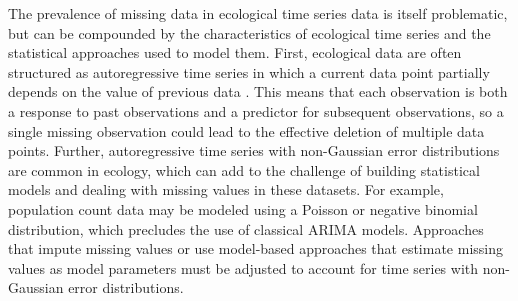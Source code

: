\documentclass{article}
\begin{document}
The prevalence of missing data in ecological time series data is itself problematic, but can be compounded by the characteristics of ecological time series and the statistical approaches used to model them. First, ecological data are often structured as autoregressive time series in which a current data point partially depends on the value of previous data%
. This means that each observation is both a response to past observations and a predictor for subsequent observations, so a single missing observation could lead to the effective deletion of multiple data points. %
Further, autoregressive time series with non-Gaussian error distributions are common in ecology, which can add to the challenge of building statistical models and dealing with missing values in these datasets. For example, population count data may be modeled using a Poisson or negative binomial distribution, which precludes the use of classical ARIMA models. Approaches that impute missing values or use model-based approaches that estimate missing values as model parameters must be adjusted to account for time series with non-Gaussian error distributions. 
\end{document}
